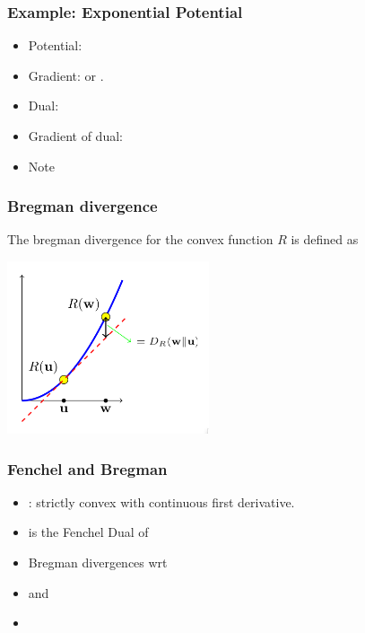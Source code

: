 \documentclass[handout]{beamer}
\begin{document}
\begin{frame}
  \frametitle{Example: Exponential Potential}
  \begin{itemize}
  \item Potential: 
  \item Gradient:  or .
  \item Dual:  
  \item Gradient of dual:  
  \item Note 
   \end{itemize}
 \end{frame}

 \begin{frame}
   \frametitle{Bregman divergence}
   The bregman divergence for the convex function $R$ is defined as
\R{   \[
D_R(\mathbf{w} \| \mathbf{u}) = R(\mathbf{w}) - \left( R(\mathbf{u}) + \langle \nabla R(\mathbf{u}), \mathbf{w} - \mathbf{u} \rangle \right).
\]}
\begin{center}
\includegraphics[height=2in]{figures/BregmanDivergence.png}
\end{center}

 \end{frame}
 
\begin{frame}
  \frametitle{Fenchel and Bregman}
  \begin{itemize}
  \item
    : strictly convex with continuous first derivative.
  \item {} is the Fenchel Dual of 
  \item {} Bregman divergences wrt 
  \item {} and 
  \item {}
  \end{itemize}
\end{frame}
\end{document}
